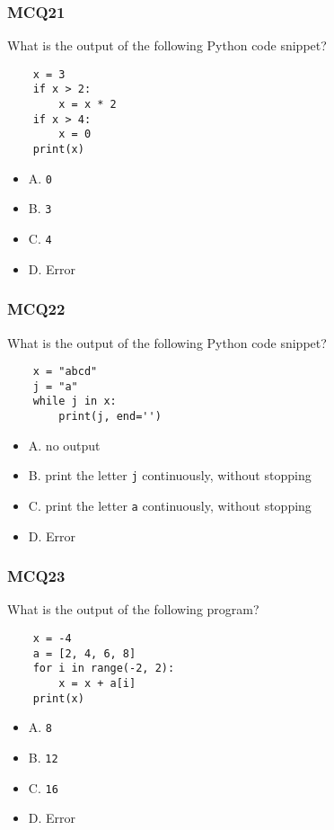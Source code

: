 \documentclass{beamer}
\begin{document}
\begin{frame}[fragile]
    \frametitle{MCQ21}
    What is the output of the following Python code snippet?
    \begin{verbatim}
    x = 3
    if x > 2:
        x = x * 2
    if x > 4:
        x = 0
    print(x)
    \end{verbatim}
    \begin{itemize}
        \item A. \texttt{0}
        \item B. \texttt{3}
        \item C. \texttt{4}
        \item D. Error
    \end{itemize}
\end{frame}

\begin{frame}[fragile]
    \frametitle{MCQ22}
    What is the output of the following Python code snippet?
    \begin{verbatim}
    x = "abcd"
    j = "a"
    while j in x:
        print(j, end='')
    \end{verbatim}
    \begin{itemize}
        \item A. no output
        \item B. print the letter \texttt{j} continuously, without stopping
        \item C. print the letter \texttt{a} continuously, without stopping
        \item D. Error
    \end{itemize}
\end{frame}

\begin{frame}[fragile]
    \frametitle{MCQ23}
    What is the output of the following program?
    \begin{verbatim}
    x = -4
    a = [2, 4, 6, 8]
    for i in range(-2, 2):
        x = x + a[i]
    print(x)
    \end{verbatim}
    \begin{itemize}
        \item A. \texttt{8}
        \item B. \texttt{12}
        \item C. \texttt{16}
        \item D. Error
    \end{itemize}
\end{frame}
\end{document}
